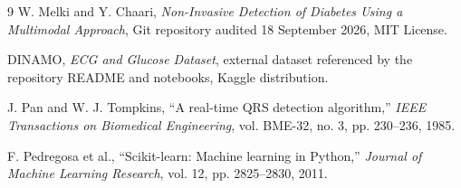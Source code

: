 \documentclass[11pt,a4paper]{article}
\begin{document}
\begin{thebibliography}{9}
W. Melki and Y. Chaari, \emph{Non-Invasive Detection of Diabetes Using a Multimodal Approach}, Git repository audited 18 September 2026, MIT License.

DINAMO, \emph{ECG and Glucose Dataset}, external dataset referenced by the repository README and notebooks, Kaggle distribution.

J. Pan and W. J. Tompkins, ``A real-time QRS detection algorithm,'' \emph{IEEE Transactions on Biomedical Engineering}, vol. BME-32, no. 3, pp. 230--236, 1985.

F. Pedregosa et al., ``Scikit-learn: Machine learning in Python,'' \emph{Journal of Machine Learning Research}, vol. 12, pp. 2825--2830, 2011.
\end{thebibliography}
\end{document}
